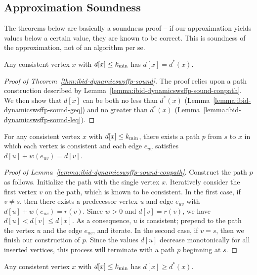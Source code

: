 \subsection{Approximation Soundness}

The theorems below are basically a soundness proof --
if our approximation yields values below a certain value,
they are known to be correct.
This is soundness of the approximation,
not of an algorithm per se.

\begin{theorem}
Any consistent vertex $x$ with $d[x] \leq k_{\mbox{\scriptsize min}}$
has $d[x] = d^*(x)$.
\label{thm:ibid-dynamicswsffp-sound}
\end{theorem}

\begin{proof}[Proof of Theorem~\ref{thm:ibid-dynamicswsffp-sound}]
The proof relies upon a path construction described by
Lemma~\ref{lemma:ibid-dynamicswsffp-sound-conpath}.
We then show that $d[x]$ can be both
no less than $d^*(x)$
(Lemma~\ref{lemma:ibid-dynamicswsffp-sound-geq})
and no greater than $d^*(x)$
(Lemma~\ref{lemma:ibid-dynamicswsffp-sound-leq}).
\end{proof}

\begin{lemma}
For any consistent vertex $x$ with $d[x] \leq k_{\mbox{\scriptsize min}}$,
there exists a path $p$ from $s$ to $x$
in which each vertex is consistent
and each edge $e_{uv}$ satisfies $d[u] + w(e_{uv}) = d[v]$.
\label{lemma:ibid-dynamicswsffp-sound-conpath}
\end{lemma}

\begin{proof}[Proof of Lemma~\ref{lemma:ibid-dynamicswsffp-sound-conpath}]
Construct the path $p$ as follows.
Initialize the path with the single vertex $x$.
Iteratively consider the first vertex $v$ on the path,
which is known to be consistent.
In the first case, if $v \neq s$,
then there exists a predecessor vertex $u$ and edge $e_{uv}$
with $d[u] + w(e_{uv}) = r(v)$.
Since $w > 0$ and $d[v] = r(v)$,
we have $d[u] < d[v] \leq d[x]$.
As a consequence,
$u$ is consistent;
prepend to the path the vertex $u$ and the edge $e_{uv}$,
and iterate.
In the second case, if $v = s$,
then we finish our construction of $p$.
Since the values $d[u]$ decrease monotonically
for all inserted vertices,
this process will terminate with a path $p$ beginning at $s$.
\end{proof}

\begin{lemma}
Any consistent vertex $x$ with $d[x] \leq k_{\mbox{\scriptsize min}}$
has $d[x] \geq d^*(x)$.
\label{lemma:ibid-dynamicswsffp-sound-geq}
\end{lemma}

